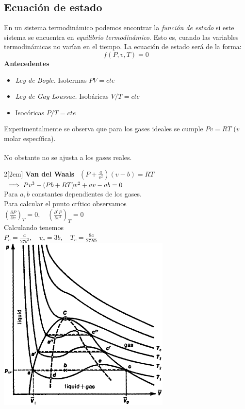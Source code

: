 \documentclass[leqno]{article}
\begin{document}
\subsection{Ecuación de estado}
En un sistema termodinámico podemos encontrar la \textit{función de estado} si este sistema se encuentra en \textit{equilibrio termodinámico}. Esto es, cuando las variables termodinámicas no varían en el tiempo. La ecuación de estado será de la forma:
$$
\boxed{f(P, v, T) = 0} 
$$
\textbf{Antecedentes}
\begin{itemize}
    \item \textit{Ley de Boyle.} Isotermas $PV=cte$
    \item \textit{Ley de Gay-Loussac.} Isobáricas $V/T=cte$
    \item Isocóricas $P/T=cte$
\end{itemize}
Experimentalmente se observa que para los gases ideales se cumple $\boxed{Pv=RT}$ ($v$ molar específica). \\
\\
No obstante no se ajusta a los gases reales. 
\begin{multicols}{2}[\columnsep2em]
\noindent
\textbf{Van del Waals} $ \ \
\boxed{(P+\frac{a}{v^2})(v-b) = RT}$ \\
$
\\
\implies Pv^3 - (Pb + RT)v^2 + av - ab = 0
$\\
Para $a, b$ constantes dependientes de los gases. \\
Para calcular el punto crítico observamos \\ $\left(\frac{\partial P}{\partial v}\right)_T = 0, \quad \left(\frac{\partial^2 P}{\partial v^2}\right)_T = 0$ \\
Calculando tenemos \\
$P_c = \frac{a}{27b^2}, \quad v_c = 3b, \quad T_c = \frac{8a}{27Rb} \ \ \ \ \ \ \ \ \ \ \ \ \ $ 
\columnbreak
    \includegraphics[scale=0.4]{images/van-der-waals.png}
\end{multicols}
\end{document}

